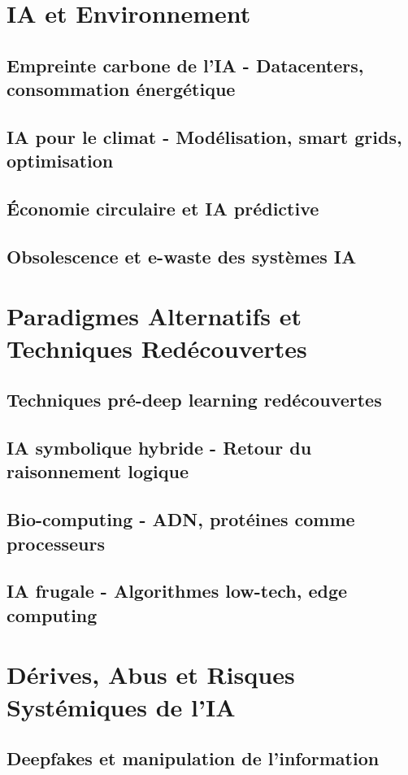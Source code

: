 \documentclass[12pt,a4paper]{book}
\begin{document}
\chapter{IA et Environnement}
\section{Empreinte carbone de l'IA - Datacenters, consommation énergétique}
\section{IA pour le climat - Modélisation, smart grids, optimisation}
\section{Économie circulaire et IA prédictive}
\section{Obsolescence et e-waste des systèmes IA}

\chapter{Paradigmes Alternatifs et Techniques Redécouvertes}
\section{Techniques pré-deep learning redécouvertes}
\section{IA symbolique hybride - Retour du raisonnement logique}
\section{Bio-computing - ADN, protéines comme processeurs}
\section{IA frugale - Algorithmes low-tech, edge computing}

\chapter{Dérives, Abus et Risques Systémiques de l'IA}
\section{Deepfakes et manipulation de l'information}
\end{document}
